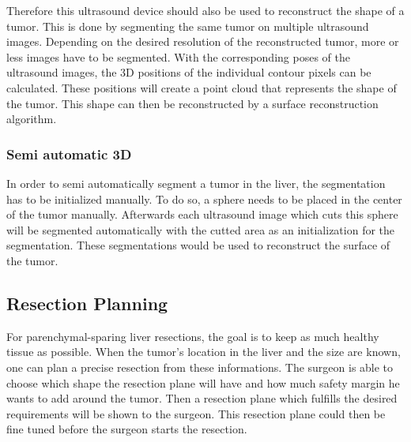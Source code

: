 Therefore this ultrasound device should also be used to
reconstruct the shape of a tumor. This is done by segmenting the same tumor on
multiple ultrasound images. Depending on the desired resolution of the
reconstructed tumor, more or less images have to be segmented. With the corresponding
poses of the ultrasound images, the 3D positions of the individual contour
pixels can be calculated. These positions will create a point cloud that
represents the shape of the tumor. This shape can then be reconstructed by a
surface reconstruction algorithm.
\subsubsection{Semi automatic 3D}
In order to semi automatically segment a tumor in the liver, the segmentation
has to be initialized manually. To do so, a sphere needs to be
placed in the center of the tumor manually. Afterwards each ultrasound image
which cuts this sphere will be segmented automatically with the cutted area as
an initialization for the segmentation. These segmentations would be used to
reconstruct the surface of the tumor.
\subsection{Resection Planning}
For parenchymal-sparing liver resections, the goal is to keep as much healthy tissue as
possible. When the tumor's location in the liver and the size are known, one can plan a
precise resection from these informations. The surgeon is able to choose
which shape the resection plane will have and how much safety margin he wants to
add around the tumor. Then a resection plane which fulfills the desired requirements
will be shown to the surgeon. This resection plane could then be fine tuned before the
surgeon starts the resection.

